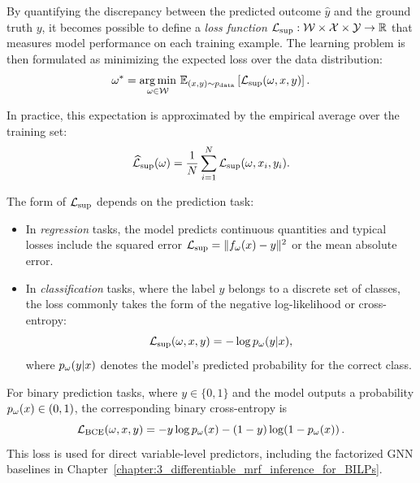 By quantifying the discrepancy between the predicted outcome $\hat{y}$ and the ground truth $y$, it becomes possible to define a \emph{loss function} $\mathcal{L}_{\mathrm{sup}} : \mathcal{W} \times \mathcal{X} \times \mathcal{Y} \rightarrow \mathbb{R}$ that measures model performance on each training example. The learning problem is then formulated as minimizing the expected loss over the data distribution:
\begin{equation}
    \label{equ:supervised_learning}
    \omega^* = \operatorname*{arg\,min}_{\omega \in \mathcal{W}} \, \mathbb{E}_{(x,y) \sim p_{\mathrm{data}}} \left[ \mathcal{L}_{\mathrm{sup}}(\omega, x, y) \right].
\end{equation}

In practice, this expectation is approximated by the empirical average over the training set:
\begin{equation}
    \widehat{\mathcal{L}}_{\mathrm{sup}}(\omega) = \frac{1}{N} \sum_{i=1}^{N} \mathcal{L}_{\mathrm{sup}}(\omega, x_i, y_i).
\end{equation}

The form of $\mathcal{L}_{\mathrm{sup}}$ depends on the prediction task:
\begin{itemize}
    \item In \emph{regression} tasks, the model predicts continuous quantities and typical losses include the squared error $\mathcal{L}_{\mathrm{sup}} = \| f_{\omega}(x) - y \|^2$ or the mean absolute error.
    \item In \emph{classification} tasks, where the label $y$ belongs to a discrete set of classes, the loss commonly takes the form of the negative log-likelihood or cross-entropy:
    \begin{equation}
        \mathcal{L}_{\mathrm{sup}}(\omega, x, y) = - \log p_{\omega}(y|x),
    \end{equation}
    where $p_{\omega}(y|x)$ denotes the model’s predicted probability for the correct class.
\end{itemize}

For binary prediction tasks, where $y\in\{0,1\}$ and the model outputs a probability $p_{\omega}(x)\in(0,1)$, the corresponding binary cross-entropy is
\begin{equation}
    \mathcal{L}_{\mathrm{BCE}}(\omega,x,y)
    =
    -y\log p_{\omega}(x)
    -(1-y)\log\!\left(1-p_{\omega}(x)\right).
\end{equation}
This loss is used for direct variable-level predictors, including the factorized GNN baselines in Chapter~\ref{chapter:3_differentiable_mrf_inference_for_BILPs}.

